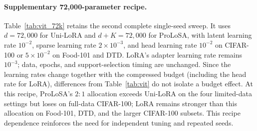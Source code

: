 \paragraph{Supplementary 72,000-parameter recipe.}
Table~\ref{tab:vit_72k} retains the second complete single-seed sweep. It uses $d=72{,}000$ for Uni-LoRA and $d+K=72{,}000$ for ProLoSA, with latent learning rate $10^{-2}$, sparse learning rate $2\times10^{-3}$, and head learning rate $10^{-2}$ on CIFAR-100 or $5\times10^{-2}$ on Food-101 and DTD. LoRA's adapter learning rate remains $10^{-3}$; data, epochs, and support-selection timing are unchanged. Since the learning rates change together with the compressed budget (including the head rate for LoRA), differences from Table~\ref{tab:vit} do not isolate a budget effect. At this recipe, ProLoSA's $2:1$ allocation exceeds Uni-LoRA on the four limited-data settings but loses on full-data CIFAR-100; LoRA remains stronger than this allocation on Food-101, DTD, and the larger CIFAR-100 subsets. This recipe dependence reinforces the need for independent tuning and repeated seeds.

\begin{table}[t]
\centering\small
\setlength{\tabcolsep}{5pt}

\caption{Supplementary ViT-B/16 recipe: final-model accuracy (\%, seed 42), with 72,000 active adapter parameters for both compressed methods and 147,456 for LoRA, plus the shared classification head. All available ProLoSA ratios are retained. Learning rates differ from the main vision table as specified in the text.}
\label{tab:vit_72k}
\end{table}
